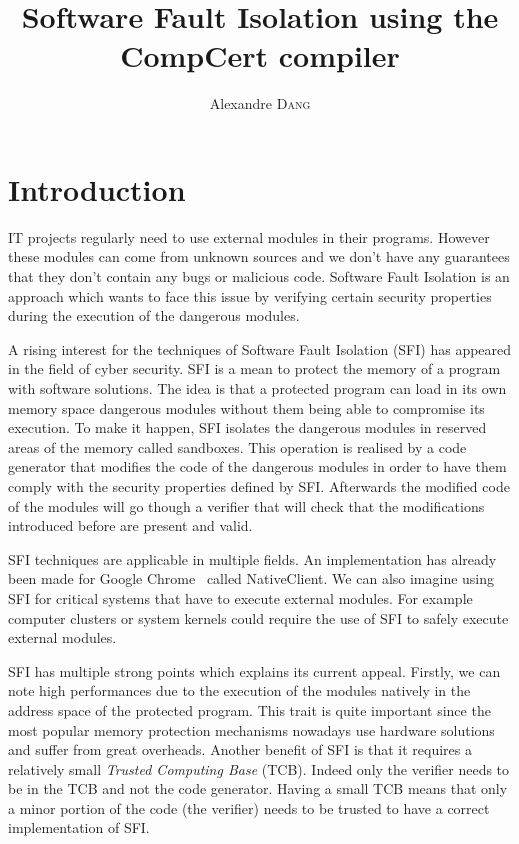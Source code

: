\documentclass[11pt]{sdm}
\title{Software Fault Isolation using the CompCert compiler}
\author{Alexandre \textsc{Dang}}
\begin{document}
\maketitle


\newpage
\section{Introduction}
IT projects regularly need to use external modules in their programs. However these modules can come from unknown sources and we don't have any guarantees that they don't contain any bugs or malicious code. Software Fault Isolation is an approach which wants to face this issue by verifying certain security properties during the execution of the dangerous modules.

A rising interest for the techniques of Software Fault Isolation (SFI) has appeared in the field of cyber security. SFI is a mean to protect the memory of a program with software solutions. 
The idea is that a protected program can load in its own memory space dangerous modules without them being able to compromise its execution.
To make it happen, SFI isolates the dangerous modules in reserved areas of the memory called sandboxes. This operation is realised by a code generator that modifies the code of the dangerous modules in order to have them comply with the security properties defined by SFI. 
Afterwards the modified code of the modules will go though a verifier that will check that the modifications introduced before are present and valid.

SFI techniques are applicable in multiple fields. An implementation has already been made for Google Chrome~\cite{Yee:2010:NCS:1629175.1629203}\cite{Sehr:2010:ASF:1929820.1929822} called NativeClient. We can also imagine using SFI for critical systems that have to execute external modules.
For example computer clusters or system kernels could require the use of SFI to safely execute external modules.

SFI has multiple strong points which explains its current appeal. Firstly, we can note high performances due to the execution of the modules natively in the address space of the protected program. This trait is quite important since the most popular memory protection mechanisms nowadays use hardware solutions and suffer from great overheads. Another benefit of SFI is that it requires a relatively small \textit{Trusted Computing Base} (TCB). Indeed only the verifier needs to be in the TCB and not the code generator. Having a small TCB means that only a minor portion of the code (the verifier) needs to be trusted to have a correct implementation of SFI.
\end{document}
